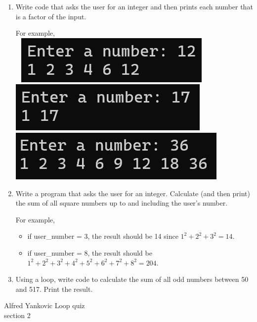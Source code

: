 \documentclass{article}
\begin{document}
\begin{enumerate}
	\item 
		Write code that asks the user for an integer and then prints each number that is a 
		factor of the input.
	
		For example, \\ \ \hfill
		\includegraphics[height = .35in]{./imgs/factors1.PNG} \hfill  
		\includegraphics[height = .35in]{./imgs/factors2.PNG} \hfill  
		\includegraphics[height = .35in]{./imgs/factors3.PNG} \hfill \


	\item 
		Write a program that asks the user for an integer.  Calculate (and then print) the 
		sum of all square numbers up to and including the user's number.

		For example, 
		\begin{itemize}
			\item if user\_number = 3, the result should be 14 since $1^2 + 2^2 + 3^2 = 14$.
			\item if user\_number = 8, the result should be $1^2+2^2+3^2+4^2+5^2+6^2+7^2+8^2=204$.
		\end{itemize}









	\item 
		Using a loop, write code to calculate the sum of all odd numbers between 50 and 517. 
		Print the result.


\end{enumerate}
\pagebreak
Alfred Yankovic \hfill Loop quiz\\
section 2\\
\end{document}
